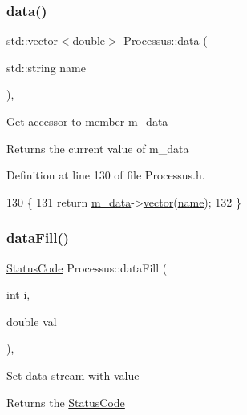 \subsubsection{\texorpdfstring{data()}{data()}\hspace{0.1cm}{\footnotesize\ttfamily [3/3]}}
{\footnotesize\ttfamily std\+::vector$<$double$>$ Processus\+::data (\begin{DoxyParamCaption}\item[{std\+::string}]{name }\end{DoxyParamCaption})\hspace{0.3cm}{\ttfamily [inline]}, {\ttfamily [inherited]}}

Get accessor to member m\+\_\+data \begin{DoxyReturn}{Returns}
the current value of m\+\_\+data 
\end{DoxyReturn}


Definition at line 130 of file Processus.\+h.


\begin{DoxyCode}
130                                         \{
131     \textcolor{keywordflow}{return} \hyperlink{classProcessus_a3da9a9de8af54e2f47807a3e09dfccff}{m\_data}->\hyperlink{classData_a94e00cdd58c1d6f11487f1ac47fee4bc}{vector}(\hyperlink{classObject_a300f4c05dd468c7bb8b3c968868443c1}{name});
132   \}
\end{DoxyCode}
\mbox{\label{classProcessus_a0d093b48f3218a088ba030e24372f18c}} 
\subsubsection{\texorpdfstring{data\+Fill()}{dataFill()}\hspace{0.1cm}{\footnotesize\ttfamily [1/2]}}
{\footnotesize\ttfamily \hyperlink{classStatusCode}{Status\+Code} Processus\+::data\+Fill (\begin{DoxyParamCaption}\item[{int}]{i,  }\item[{double}]{val }\end{DoxyParamCaption})\hspace{0.3cm}{\ttfamily [inline]}, {\ttfamily [inherited]}}

Set data stream with value \begin{DoxyReturn}{Returns}
the \hyperlink{classStatusCode}{Status\+Code} 
\end{DoxyReturn}


